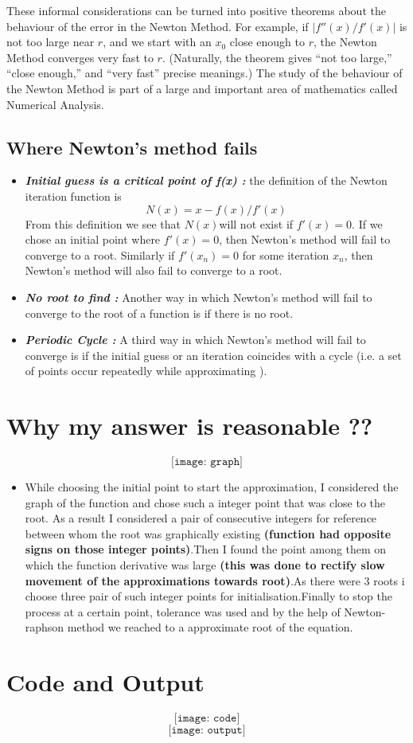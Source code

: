 \documentclass{article}
\begin{document}
 These informal considerations can be turned into positive theorems about
the behaviour of the error in the Newton Method. For example, if \(|f''(x)/f'(x)|\) is not too large near \(r\), and we start with an \(x_0\) close enough to \(r\), the Newton Method converges very fast to \(r\). (Naturally, the theorem gives “not too
large,” “close enough,” and “very fast” precise meanings.)
The study of the behaviour of the Newton Method is part of a large and
important area of mathematics called Numerical Analysis.

\subsection{Where Newton’s method fails}

\begin{itemize}
    \item \textbf{\textit{Initial guess is a critical point of f(x) :}} the
definition of the Newton iteration function is
\[N(x) = x-f(x)/f'(x)\]
From this definition we see that \(N(x)\)will not exist if \(f'(x) = 0\). If we chose an
initial point where \(f'(x) = 0\), then Newton’s method will fail to converge to a root.
Similarly if \(f'(x_n) = 0\) for some iteration \(x_n\), then Newton’s method will also fail to converge to a root.

\item \textbf{\textit{No root to find :}} Another way in which Newton’s method will fail to converge
to the root of a function is if there is no root.
    
    \item \textbf{\textit{Periodic Cycle :}} A third way in which Newton’s method will fail to converge is if the initial guess or an iteration coincides with a cycle (i.e. a set of points occur repeatedly while approximating ).
\end{itemize}
\vspace{20mm}
\section{Why my answer is reasonable ??}
\[\texttt{[image: graph]}\]
\begin{itemize}

    \item While choosing the initial point to start the approximation, I considered the graph of the function and chose such a integer point that was close to the root. As a result I considered a pair of consecutive integers for reference between whom the  root was graphically existing \textbf{(function had opposite signs on those integer points)}.Then I found the point among them on which the function derivative was large \textbf{(this was done to rectify slow movement of the approximations towards root)}.As there were 3 roots i choose three pair of such integer points for initialisation.Finally to stop the process at a certain point, tolerance was used and by the help of Newton-raphson method we reached to a approximate root of the equation.  
\end{itemize}
\section{Code and Output}
\[\texttt{[image: code]}\]
\[\texttt{[image: output]}\]
 
\end{document}
